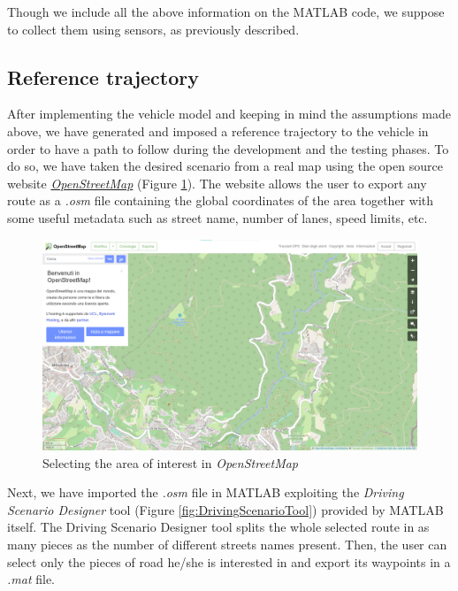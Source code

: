 Though we include all the above information on the MATLAB code, we suppose to collect them using sensors, as previously described.








\subsection{Reference trajectory}
After implementing the vehicle model and keeping in mind the assumptions made above, we have generated and imposed a reference trajectory to the vehicle in order to have a path to follow during the development and the testing phases.
To do so, we have taken the desired scenario from a real map using the open source website \href{https://www.openstreetmap.org}{\textit{OpenStreetMap}}\cite{OpenStreetMap} (Figure \ref{fig:OpenStreetMap}).
The website allows the user to export any route as a \textit{.osm} file containing the global coordinates of the area together with some useful metadata such as street name, number of lanes, speed limits, etc.

\begin{figure}[H]
    \centering
    \includegraphics[width=1\textwidth]{Figures/OpenStreetMap.png}
    \caption{Selecting the area of interest in \textit{OpenStreetMap}}
      \label{fig:OpenStreetMap}
\end{figure}

Next, we have imported the \textit{.osm} file in MATLAB exploiting the \textit{Driving Scenario Designer} tool (Figure \ref{fig:DrivingScenarioTool}) provided by MATLAB itself. The Driving Scenario Designer tool splits the whole selected route in as many pieces as the number of different streets names present. Then, the user can select only the pieces of road he/she is interested in and export its waypoints in a \textit{.mat} file.

